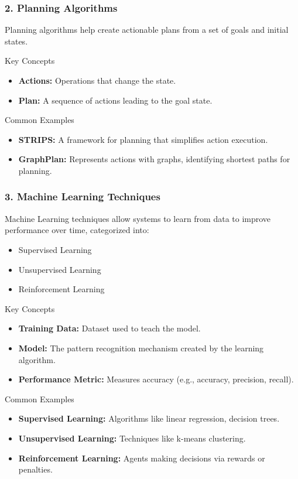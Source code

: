 \documentclass[aspectratio=169]{beamer}
\begin{document}
\begin{frame}[fragile]
  \frametitle{2. Planning Algorithms}
  Planning algorithms help create actionable plans from a set of goals and initial states.

  \begin{block}{Key Concepts}
    \begin{itemize}
      \item \textbf{Actions:} Operations that change the state.
      \item \textbf{Plan:} A sequence of actions leading to the goal state.
    \end{itemize}
  \end{block}

  \begin{block}{Common Examples}
    \begin{itemize}
      \item \textbf{STRIPS:} A framework for planning that simplifies action execution.
      \item \textbf{GraphPlan:} Represents actions with graphs, identifying shortest paths for planning.
    \end{itemize}
  \end{block}
\end{frame}

\begin{frame}[fragile]
  \frametitle{3. Machine Learning Techniques}
  Machine Learning techniques allow systems to learn from data to improve performance over time, categorized into:
  \begin{itemize}
    \item Supervised Learning
    \item Unsupervised Learning
    \item Reinforcement Learning
  \end{itemize}

  \begin{block}{Key Concepts}
    \begin{itemize}
      \item \textbf{Training Data:} Dataset used to teach the model.
      \item \textbf{Model:} The pattern recognition mechanism created by the learning algorithm.
      \item \textbf{Performance Metric:} Measures accuracy (e.g., accuracy, precision, recall).
    \end{itemize}
  \end{block}

  \begin{block}{Common Examples}
    \begin{itemize}
      \item \textbf{Supervised Learning:} Algorithms like linear regression, decision trees.
      \item \textbf{Unsupervised Learning:} Techniques like k-means clustering.
      \item \textbf{Reinforcement Learning:} Agents making decisions via rewards or penalties.
    \end{itemize}
  \end{block}
\end{frame}
\end{document}
